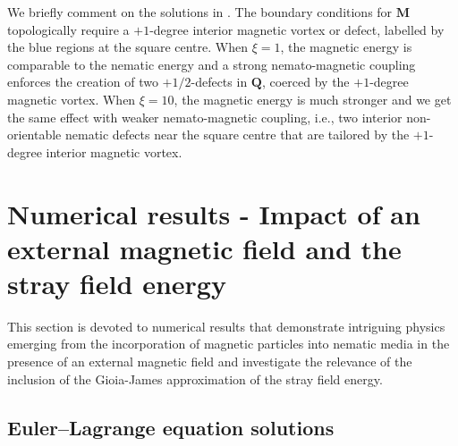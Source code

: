 \documentclass{article}
\def\Qvec{\mathbf{Q}}
\def \Mvec{\mathbf{M}}
\begin{document}
We briefly comment on the solutions in . The boundary conditions for $\Mvec$ topologically require a $+1$-degree interior magnetic vortex or defect, labelled by the blue regions at the square centre. When $\xi=1$, the magnetic energy is comparable to the nematic energy and a strong nemato-magnetic coupling enforces the creation of two $+1/2$-defects in $\Qvec$, coerced by the $+1$-degree magnetic vortex. When $\xi=10$, the magnetic energy is much stronger and we get the same effect with weaker nemato-magnetic coupling, i.e., two interior non-orientable nematic defects near the square centre that are tailored by the $+1$-degree interior magnetic vortex. 


\section{Numerical results - Impact of an external magnetic field and the stray field energy} \label{sec:numerical_experiments}
 This section is devoted to numerical results that demonstrate intriguing physics emerging from the incorporation of magnetic particles into nematic media in the presence of an external magnetic field and investigate the relevance  of the inclusion of the Gioia-James approximation of the stray field energy.
\subsection{Euler--Lagrange equation solutions}
\end{document}
